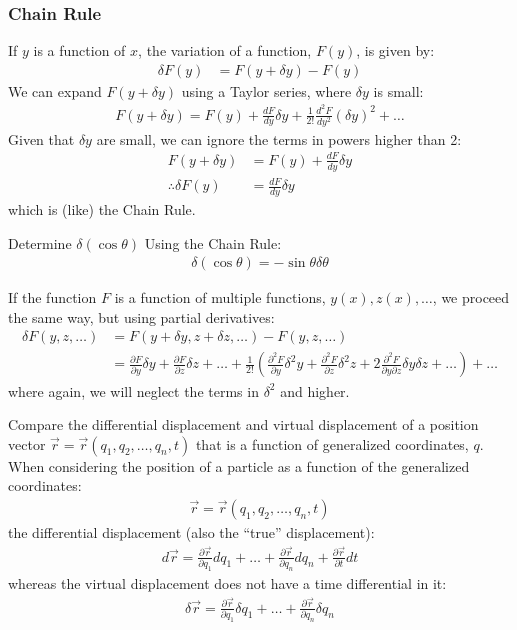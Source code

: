 \subsubsection{Chain Rule}
If $y$ is a function of $x$, the variation of a function, $F(y)$, is given by:
\begin{align}
\delta F(y) &= F(y+\delta y)-F(y)
\end{align}
We can expand $F(y+\delta y)$ using a Taylor series, where $\delta y$ is small:
\begin{align}
F(y+\delta y)=F(y)+\frac{dF}{dy}\delta y + \frac{1}{2!}\frac{d^2F}{dy^2}(\delta y)^2+\dots 
\end{align}
Given that $\delta y$ are small, we can ignore the terms in powers higher than 2:
\begin{align}
F(y+\delta y)&=F(y)+\frac{dF}{dy}\delta y\nonumber\\
\therefore \delta F(y)&=\frac{dF}{dy}\delta y
\label{eqn:varChainRule}
\end{align}
which is (like) the Chain Rule.
\begin{example}{0pt}{Determine $\delta(\cos{\theta})$}{}
Using the Chain Rule:
\begin{align*}
\delta(\cos{\theta})=-\sin{\theta}\delta\theta
\end{align*}
\end{example}
\noindent
If the function $F$ is a function of multiple functions, $y(x), z(x), \dots$, we proceed the same way, but using partial derivatives:
\begin{align}
\delta F(y,z,\dots) &= F(y+\delta y, z+\delta z, \dots)-F(y,z,\dots)\nonumber\\
&=\frac{\partial F}{\partial y}\delta y +\frac{\partial F}{\partial z}\delta z+\dots+ \frac{1}{2!}\left(\frac{\partial^2F}{\partial y}\delta^2y+\frac{\partial^2F}{\partial z}\delta^2z+2\frac{\partial^2 F}{\partial y\partial z}\delta y \delta z+\dots \right) +\dots
\label{eqn:varChainRuleMulti}
\end{align}
where again, we will neglect the terms in $\delta^2$ and higher.
\begin{example}{0pt}{Compare the differential displacement and virtual displacement of a position vector $\vec{r}=\vec{r}(q_1,q_2,\dots,q_n,t)$ that is a function of generalized coordinates, $q$.}{}
When considering the position of a particle as a function of the generalized coordinates:
\begin{align*}
\vec{r}=\vec{r}(q_1,q_2,\dots,q_n,t)
\end{align*}
the differential displacement (also the ``true'' displacement):
\begin{align*}
d\vec{r}=\frac{\partial\vec{r}}{\partial q_1}dq_1+\dots+\frac{\partial\vec{r}}{\partial q_n}dq_n+\frac{\partial\vec{r}}{\partial t}dt
\end{align*}
whereas the virtual displacement does not have a time differential in it:
\begin{align*}
\delta\vec{r}=\frac{\partial\vec{r}}{\partial q_1}\delta q_1+\dots+\frac{\partial\vec{r}}{\partial q_{n}}\delta q_{n}
\end{align*}
\end{example}

